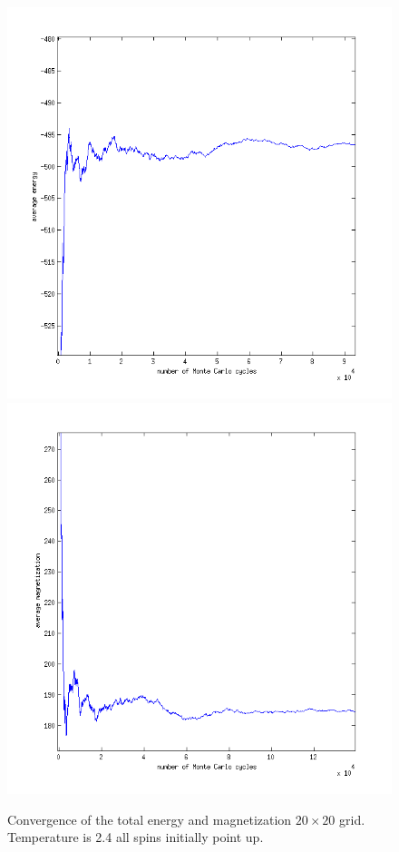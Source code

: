 \documentclass[a4paper,english, 10pt, twoside]{article}
\begin{document}
\begin{figure}[H]
 \includegraphics[scale=0.45]{energy_ordered_temp2dot4_zoom.png}
 \includegraphics[scale=0.45]{magnetization_ordered_temp2dot4_zoom}
 \caption{Convergence of the total energy and magnetization $20 \times 20$ grid. Temperature is 2.4 all spins initially point up.}
\label{both_ordered_temp2.4}
 \end{figure} 
\end{document}
